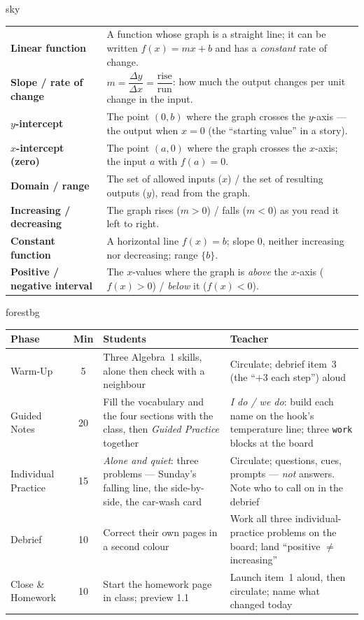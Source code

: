 \documentclass[10pt]{article}
\newcommand{\MeetingLength}{60 minutes}
\begin{document}
\begin{skillbox}{sky}
\renewcommand{\arraystretch}{1.3}
\begin{tabularx}{\linewidth}{@{}l X@{}}
\textbf{Linear function} & A function whose graph is a straight line; it can be written $f(x)=mx+b$ and has a \emph{constant} rate of change. \\
\textbf{Slope / rate of change} & $m=\dfrac{\Delta y}{\Delta x}=\dfrac{\text{rise}}{\text{run}}$: how much the output changes per unit change in the input. \\
\textbf{$y$-intercept} & The point $(0,b)$ where the graph crosses the $y$-axis --- the output when $x=0$ (the ``starting value'' in a story). \\
\textbf{$x$-intercept (zero)} & The point $(a,0)$ where the graph crosses the $x$-axis; the input $a$ with $f(a)=0$. \\
\textbf{Domain / range} & The set of allowed inputs ($x$) / the set of resulting outputs ($y$), read from the graph. \\
\textbf{Increasing / decreasing} & The graph rises ($m>0$) / falls ($m<0$) as you read it left to right. \\
\textbf{Constant function} & A horizontal line $f(x)=b$; slope $0$, neither increasing nor decreasing; range $\{b\}$. \\
\textbf{Positive / negative interval} & The $x$-values where the graph is \emph{above} the $x$-axis ($f(x)>0$) / \emph{below} it ($f(x)<0$). \\
\end{tabularx}
\end{skillbox}

\begin{fixedskillbox}[Lesson at a Glance --- \MeetingLength]{forestbg}
\renewcommand{\arraystretch}{1.25}
\begin{tabularx}{\linewidth}{@{}l c X X@{}}
\textbf{Phase} & \textbf{Min} & \textbf{Students} & \textbf{Teacher} \\
\hline
Warm-Up & 5 & Three Algebra~1 skills, alone then check with a neighbour & Circulate; debrief item~3 (the ``$+3$ each step'') aloud \\
Guided Notes & 20 & Fill the vocabulary and the four sections with the class, then \emph{Guided Practice} together & \emph{I do / we do}: build each name on the hook's temperature line; three \texttt{work} blocks at the board \\
Individual Practice & 15 & \emph{Alone and quiet}: three problems --- Sunday's falling line, the side-by-side, the car-wash card & Circulate; questions, cues, prompts --- \emph{not} answers. Note who to call on in the debrief \\
Debrief & 10 & Correct their own pages in a second colour & Work all three individual-practice problems on the board; land ``positive $\ne$ increasing'' \\
Close \& Homework & 10 & Start the homework page in class; preview 1.1 & Launch item~1 aloud, then circulate; name what changed today \\
\end{tabularx}
\end{fixedskillbox}
\end{document}
